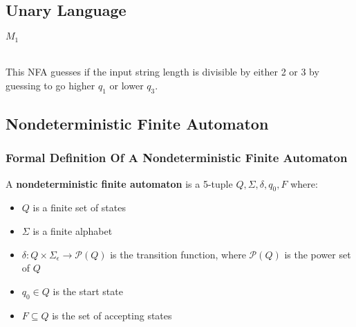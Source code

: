 \documentclass[11pt,a4paper]{article}
\begin{document}
\subsection{Unary Language}
\begin{example} $M_1$

     \\

    This NFA guesses if the input string length is divisible by either 2 or 3 by guessing to go higher $q_1$ or lower $q_3$.
\end{example}

\subsection{Nondeterministic Finite Automaton}
\subsubsection{Formal Definition Of A Nondeterministic Finite Automaton}
\begin{definition}
    A \textbf{nondeterministic finite automaton} is a 5-tuple $Q,\Sigma,\delta,q_0,F$ where:
    \begin{itemize}
        \item $Q$ is a finite set of states
        \item $\Sigma$ is a finite alphabet
        \item $\delta :Q\times\Sigma_{\epsilon}\rightarrow \mathcal{P}(Q)$ is the transition function, where $\mathcal{P}(Q)$ is the power set of $Q$
        \item $q_0\in Q$ is the start state
        \item $F\subseteq Q$ is the set of accepting states
    \end{itemize}
\end{definition}
\end{document}
